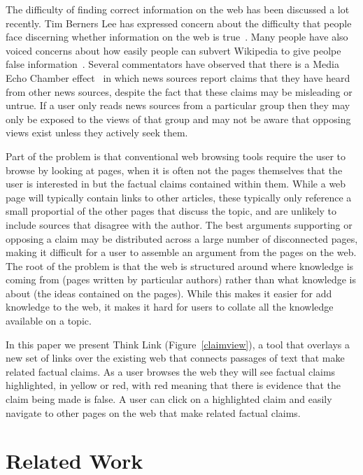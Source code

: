 \documentclass{chi2009}
\begin{document}
The difficulty of finding correct information on the web has been discussed a lot recently. Tim Berners Lee has expressed concern about the difficulty that people face discerning whether information on the web is true~\cite{bbcwebwarning}. Many people have also voiced concerns about how easily people can subvert Wikipedia to give peolpe false information~\cite{wikifalse}. Several commentators have observed that there is a Media Echo Chamber effect~\cite{echochamber,echochamber2} in which news sources report claims that they have heard from other news sources, despite the fact that these claims may be misleading or untrue. If a user only reads news sources from a particular group then they may only be exposed to the views of that group and may not be aware that opposing views exist unless they actively seek them.  

Part of the problem is that conventional web browsing tools require the user to browse by looking at pages, when it is often not the pages themselves that the user is interested in but the factual claims contained within them. While a web page will typically contain links to other articles, these typically only reference a small proportial of the other pages that discuss the topic, and are unlikely to include sources that disagree with the author. The best arguments supporting or opposing a claim may be distributed across a large number of disconnected pages, making it difficult for a user to assemble an argument from the pages on the web. The root of the problem is that the web is structured around where knowledge is coming from (pages written by particular authors) rather than what knowledge is about (the ideas contained on the pages). While this makes it easier for add knowledge to the web, it makes it hard for users to collate all the knowledge available on a topic.

In this paper we present Think Link (Figure~\ref{claimview}), a tool that overlays a new set of links over the existing web that connects passages of text that make related factual claims. As a user browses the web they will see factual claims highlighted, in yellow or red, with red meaning that there is evidence that the claim being made is false. A user can click on a highlighted claim and easily navigate to other pages on the web that make related factual claims.


\section{Related Work}
\end{document}
